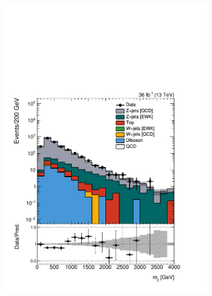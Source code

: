 \begin{figure}[]
\begin{center}
\begin{subfigure}[t]{0.24\textwidth}
            \includegraphics[width=\textwidth]{figures/vbf/prefit/dielectron_jot12Mass_logy.pdf}
        \end{subfigure}
        \begin{subfigure}[t]{0.24\textwidth}

\end{subfigure}
\end{center}
\end{figure}
